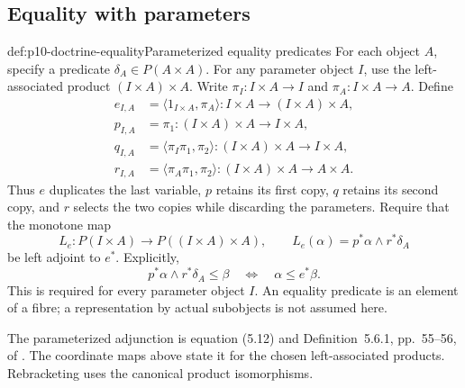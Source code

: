 \subsection{Equality with parameters}
\label{sec:p10-doctrine-equality}

\begin{hbdefinition}{def:p10-doctrine-equality}{Parameterized equality predicates}
For each object \(A\), specify a predicate
\(\delta_A\in P(A\times A)\).
For any parameter object \(I\), use the left-associated product
\((I\times A)\times A\).
Write \(\pi_I:I\times A\to I\) and \(\pi_A:I\times A\to A\).
Define
\[
 \begin{aligned}
 e_{I,A}
    &=\langle1_{I\times A},\pi_A\rangle:
                        I\times A\longrightarrow(I\times A)\times A,\\
 p_{I,A}
    &=\pi_1:(I\times A)\times A\longrightarrow I\times A,\\
 q_{I,A}
    &=\langle\pi_I\pi_1,\pi_2\rangle:
                        (I\times A)\times A\longrightarrow I\times A,\\
 r_{I,A}
    &=\langle\pi_A\pi_1,\pi_2\rangle:
                        (I\times A)\times A\longrightarrow A\times A.
 \end{aligned}
\]
Thus \(e\) duplicates the last variable, \(p\) retains its first
copy, \(q\) retains its second copy, and \(r\) selects the two
copies while discarding the parameters.
Require that the monotone map
\[
 L_e:P(I\times A)\longrightarrow P((I\times A)\times A),
 \qquad L_e(\alpha)=p^*\alpha\wedge r^*\delta_A
\]
be left adjoint to \(e^*\).  Explicitly,
\[
              p^*\alpha\wedge r^*\delta_A\leq\beta
                  \quad\Longleftrightarrow\quad
              \alpha\leq e^*\beta .
\]
This is required for every parameter object \(I\).
An equality predicate is an element of a fibre; a representation
by actual subobjects is not assumed here.
\end{hbdefinition}

The parameterized adjunction is equation (5.12) and
Definition~5.6.1, pp.~55--56, of
\cite{Pitts1995Draft}.
The coordinate maps above state it for the chosen left-associated
products.  Rebracketing uses the canonical product isomorphisms.

